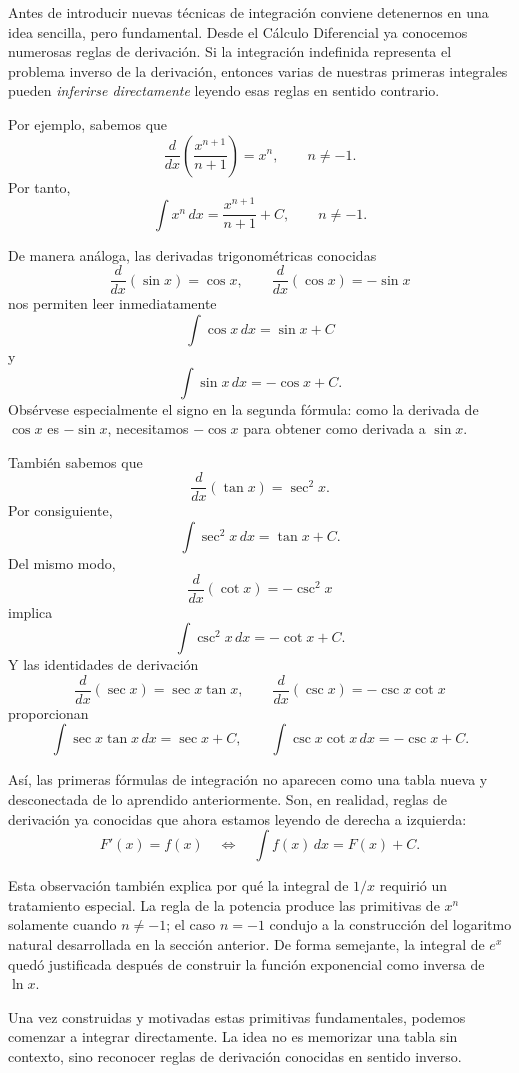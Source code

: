 \documentclass[12pt]{article}
\theoremstyle{definition}
\theoremstyle{remark}
\begin{document}
Antes de introducir nuevas técnicas de integración conviene detenernos en una idea sencilla, pero fundamental. Desde el Cálculo Diferencial ya conocemos numerosas reglas de derivación. Si la integración indefinida representa el problema inverso de la derivación, entonces varias de nuestras primeras integrales pueden \emph{inferirse directamente} leyendo esas reglas en sentido contrario.

Por ejemplo, sabemos que
\[
\frac{d}{dx}\left(\frac{x^{n+1}}{n+1}\right)=x^n,
\qquad n\neq -1.
\]
Por tanto,
\[
\boxed{\int x^n\,dx=\frac{x^{n+1}}{n+1}+C,\qquad n\neq-1.}
\]

De manera análoga, las derivadas trigonométricas conocidas
\[
\frac{d}{dx}(\sin x)=\cos x,
\qquad
\frac{d}{dx}(\cos x)=-\sin x
\]
nos permiten leer inmediatamente
\[
\boxed{\int\cos x\,dx=\sin x+C}
\]
y
\[
\boxed{\int\sin x\,dx=-\cos x+C.}
\]
Obsérvese especialmente el signo en la segunda fórmula: como la derivada de $\cos x$ es $-\sin x$, necesitamos $-\cos x$ para obtener como derivada a $\sin x$.

También sabemos que
\[
\frac{d}{dx}(\tan x)=\sec^2x.
\]
Por consiguiente,
\[
\boxed{\int\sec^2x\,dx=\tan x+C.}
\]
Del mismo modo,
\[
\frac{d}{dx}(\cot x)=-\csc^2x
\]
implica
\[
\boxed{\int\csc^2x\,dx=-\cot x+C.}
\]
Y las identidades de derivación
\[
\frac{d}{dx}(\sec x)=\sec x\tan x,
\qquad
\frac{d}{dx}(\csc x)=-\csc x\cot x
\]
proporcionan
\[
\boxed{\int\sec x\tan x\,dx=\sec x+C,}
\qquad
\boxed{\int\csc x\cot x\,dx=-\csc x+C.}
\]

Así, las primeras fórmulas de integración no aparecen como una tabla nueva y desconectada de lo aprendido anteriormente. Son, en realidad, reglas de derivación ya conocidas que ahora estamos leyendo de derecha a izquierda:
\[
\boxed{F'(x)=f(x)\quad\Longleftrightarrow\quad \int f(x)\,dx=F(x)+C.}
\]

Esta observación también explica por qué la integral de $1/x$ requirió un tratamiento especial. La regla de la potencia produce las primitivas de $x^n$ solamente cuando $n\neq-1$; el caso $n=-1$ condujo a la construcción del logaritmo natural desarrollada en la sección anterior. De forma semejante, la integral de $e^x$ quedó justificada después de construir la función exponencial como inversa de $\ln x$.

Una vez construidas y motivadas estas primitivas fundamentales, podemos comenzar a integrar directamente. La idea no es memorizar una tabla sin contexto, sino reconocer reglas de derivación conocidas en sentido inverso.
\end{document}
